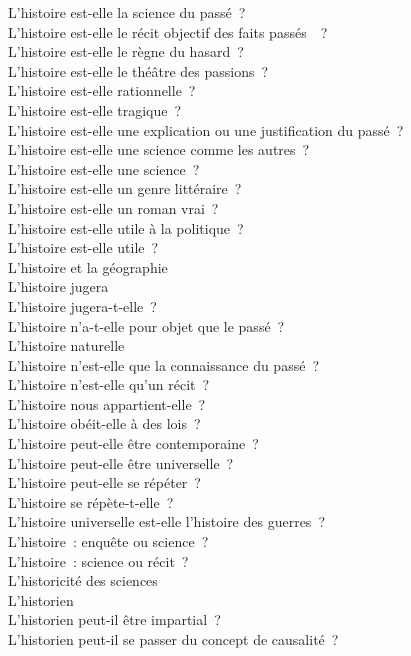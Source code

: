 \documentclass[a4paper,12pt]{article}
\begin{document}
L'histoire est-elle la science du passé ? \\
L'histoire est-elle le récit objectif des faits passés  ? \\
L'histoire est-elle le règne du hasard ? \\
L'histoire est-elle le théâtre des passions ? \\
L'histoire est-elle rationnelle ? \\
L'histoire est-elle tragique ? \\
L'histoire est-elle une explication ou une justification du passé ? \\
L'histoire est-elle une science comme les autres ? \\
L'histoire est-elle une science ? \\
L'histoire est-elle un genre littéraire ? \\
L'histoire est-elle un roman vrai ? \\
L'histoire est-elle utile à la politique ? \\
L'histoire est-elle utile ? \\
L'histoire et la géographie \\
L'histoire jugera \\
L'histoire jugera-t-elle ? \\
L'histoire n'a-t-elle pour objet que le passé ? \\
L'histoire naturelle \\
L'histoire n'est-elle que la connaissance du passé ? \\
L'histoire n'est-elle qu'un récit ? \\
L'histoire nous appartient-elle ? \\
L'histoire obéit-elle à des lois ? \\
L'histoire peut-elle être contemporaine ? \\
L'histoire peut-elle être universelle ? \\
L'histoire peut-elle se répéter ? \\
L'histoire se répète-t-elle ? \\
L'histoire universelle est-elle l'histoire des guerres ? \\
L'histoire : enquête ou science ? \\
L'histoire : science ou récit ? \\
L'historicité des sciences \\
L'historien \\
L'historien peut-il être impartial ? \\
L'historien peut-il se passer du concept de causalité ? \\
\end{document}
